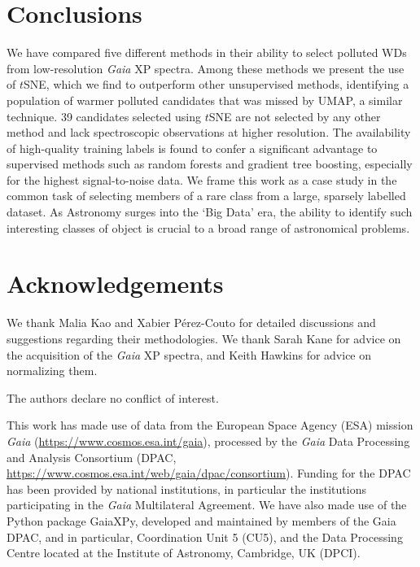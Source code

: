 \documentclass[fleqn,usenatbib]{rasti}
\begin{document}
\section{Conclusions} \label{sec:conclusion}

We have compared five different methods in their ability to select polluted WDs from low-resolution \textit{Gaia} XP spectra.
Among these methods we present the use of $t$SNE, which we find to outperform other unsupervised methods, identifying a population of warmer polluted candidates that was missed by UMAP, a similar technique.
39 candidates selected using $t$SNE are not selected by any other method and lack spectroscopic observations at higher resolution.
The availability of high-quality training labels is found to confer a significant advantage to supervised methods such as random forests and gradient tree boosting, especially for the highest signal-to-noise data.
We frame this work as a case study in the common task of selecting members of a rare class from a large, sparsely labelled dataset.
As Astronomy surges into the `Big Data' era, the ability to identify such interesting classes of object is crucial to a broad range of astronomical problems.




\section*{Acknowledgements}

We thank Malia Kao and Xabier P\'erez-Couto for detailed discussions and suggestions regarding their methodologies.
We thank Sarah Kane for advice on the acquisition of the \textit{Gaia} XP spectra, and Keith Hawkins for advice on normalizing them.

The authors declare no conflict of interest.

This work has made use of data from the European Space Agency (ESA) mission {\it Gaia} (\url{https://www.cosmos.esa.int/gaia}), processed by the {\it Gaia} Data Processing and Analysis Consortium (DPAC, \url{https://www.cosmos.esa.int/web/gaia/dpac/consortium}). Funding for the DPAC has been provided by national institutions, in particular the institutions participating in the {\it Gaia} Multilateral Agreement.
We have also made use of the Python package GaiaXPy, developed and maintained by members of the Gaia DPAC, and in particular, Coordination Unit 5 (CU5), and the Data Processing Centre located at the Institute of Astronomy, Cambridge, UK (DPCI).
\end{document}
